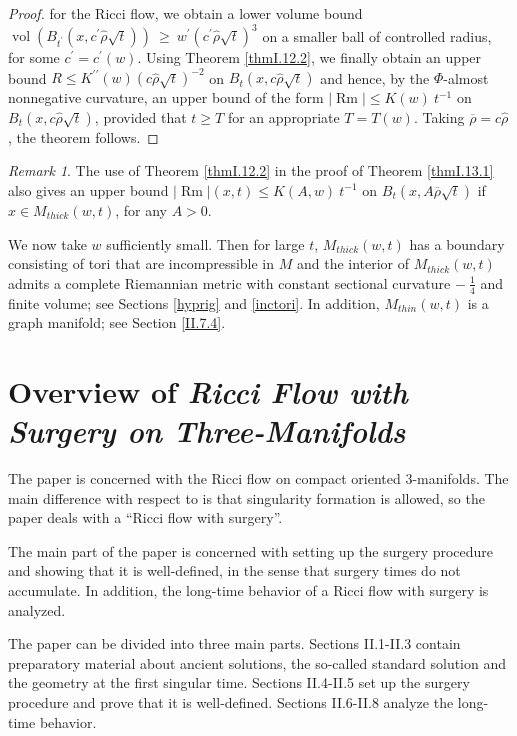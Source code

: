 \documentclass[12pt]{amsart}
\newcommand{\Rm}{\operatorname{Rm}}
\newcommand{\vol}{\operatorname{vol}}
\numberwithin{equation}{section}
\theoremstyle{plain}
\theoremstyle{definition}
\theoremstyle{remark}
\newtheorem{remark}[equation]{Remark}
\begin{document}
\begin{proof}
for the Ricci flow,
we obtain a lower volume bound 
$\vol(B_{t^\prime}(x, c^\prime \widehat{\rho} \sqrt{t}))   \: \ge \:
w^{\prime} ( c^\prime \widehat{\rho} \sqrt{t})^3$ on a smaller ball of
controlled radius, for
some $c^\prime = c^\prime(w)$.  Using Theorem \ref{thmI.12.2}, we finally
obtain an upper bound $R \le K^{\prime \prime}(w) (c\widehat{\rho} \sqrt{t})^{-2}$
on  $B_t(x, c\widehat{\rho} \sqrt{t})$ and hence,
by the $\Phi$-almost nonnegative curvature, an upper bound of the form
$|\Rm| \le K(w) \: t^{-1}$ on $B_t(x, c\widehat{\rho} \sqrt{t})$,
provided that $t \ge T$ for an appropriate $T = T(w)$.
Taking $\overline{\rho} = c \widehat{\rho}$, the theorem follows.                                                                  
\end{proof}

\begin{remark}
The use of Theorem \ref{thmI.12.2} in the proof of Theorem \ref{thmI.13.1}
also gives an upper bound $|\Rm|(x,t) \le K(A,w) \: t^{-1}$ on
$B_t(x, A \overline{\rho} \sqrt{t})$ if $x \in M_{thick}(w,t)$, for any $A > 0$.
\end{remark}

We now take $w$ sufficiently small. Then for large $t$, $M_{thick}(w,t)$ has a boundary
consisting of tori that are incompressible in $M$ and the interior of
$M_{thick}(w,t)$ admits a complete Riemannian metric with constant
sectional curvature $- \: \frac14$ and finite volume; see
Sections 
\ref{hyprig} and \ref{inctori}. In addition,
$M_{thin}(w,t)$ is a graph manifold; see 
Section \ref{II.7.4}.


\section{Overview of 
{\em Ricci Flow with Surgery on 
Three-Manifolds}  \cite{Perelman2}} \label{overview2}

The paper \cite{Perelman2} is concerned with the Ricci flow on compact oriented
$3$-manifolds.  The main difference with respect to \cite{Perelman}
is that singularity formation is allowed, so the paper deals with 
a ``Ricci flow with surgery''.

The main part of the paper is concerned with
setting up the surgery procedure and showing that it is
well-defined, in the sense that surgery times do not
accumulate.  In addition, the long-time behavior of a
Ricci flow with surgery is analyzed.

The paper can be divided into three main parts.
Sections II.1-II.3 contain preparatory material about ancient
solutions, the so-called standard solution and the geometry
at the first singular time.  Sections II.4-II.5 set up the
surgery procedure and prove that it is well-defined.
Sections II.6-II.8 analyze the long-time behavior.
\end{document}
